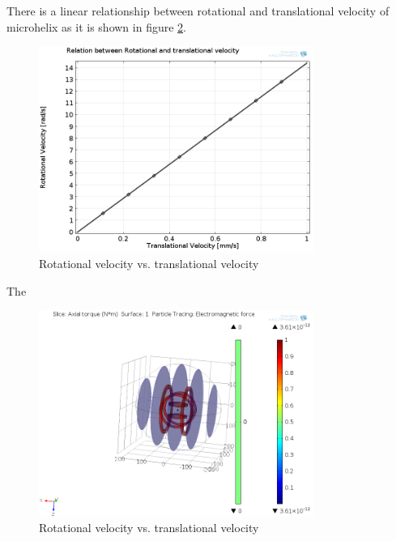 \documentclass[12pt,a4paper,titlepage]{report}
\begin{document}
There is a linear relationship between rotational and translational velocity of microhelix as it is shown 
in figure \ref{Rotational velocity vs. translational velocity}.



\begin{figure}
  \centering
    \includegraphics[width=0.80\textwidth]{Trans_Rot_}
  \caption[Rotational velocity vs. translational velocity]{Rotational velocity vs. translational velocity}
  \label{Rotational velocity vs. translational velocity}
\end{figure}




The 


\begin{figure}
  \centering
    \includegraphics[width=0.80\textwidth]{force_torque}
  \caption[Rotational velocity vs. translational velocity]{Rotational velocity vs. translational velocity}
  \label{Rotational velocity vs. translational velocity}
\end{figure}
\end{document}
